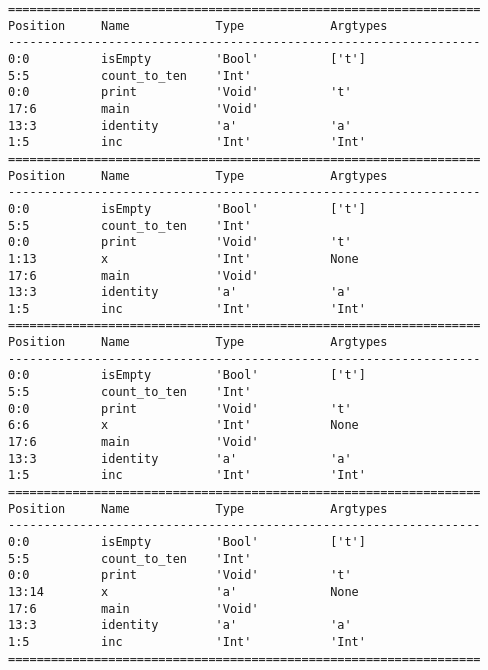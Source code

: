 \documentclass[a4paper]{article}
\begin{document}
\begin{verbatim}
==================================================================
Position     Name            Type            Argtypes            
------------------------------------------------------------------
0:0          isEmpty         'Bool'          ['t']               
5:5          count_to_ten    'Int'                               
0:0          print           'Void'          't'                 
17:6         main            'Void'                              
13:3         identity        'a'             'a'                 
1:5          inc             'Int'           'Int'               
==================================================================
Position     Name            Type            Argtypes            
------------------------------------------------------------------
0:0          isEmpty         'Bool'          ['t']               
5:5          count_to_ten    'Int'                               
0:0          print           'Void'          't'                 
1:13         x               'Int'           None                
17:6         main            'Void'                              
13:3         identity        'a'             'a'                 
1:5          inc             'Int'           'Int'               
==================================================================
Position     Name            Type            Argtypes            
------------------------------------------------------------------
0:0          isEmpty         'Bool'          ['t']               
5:5          count_to_ten    'Int'                               
0:0          print           'Void'          't'                 
6:6          x               'Int'           None                
17:6         main            'Void'                              
13:3         identity        'a'             'a'                 
1:5          inc             'Int'           'Int'               
==================================================================
Position     Name            Type            Argtypes            
------------------------------------------------------------------
0:0          isEmpty         'Bool'          ['t']               
5:5          count_to_ten    'Int'                               
0:0          print           'Void'          't'                 
13:14        x               'a'             None                
17:6         main            'Void'                              
13:3         identity        'a'             'a'                 
1:5          inc             'Int'           'Int'               
==================================================================

\end{verbatim}
\end{document}
